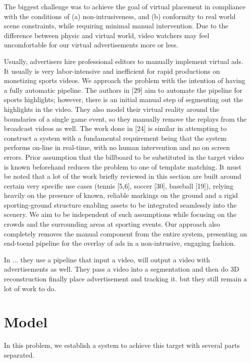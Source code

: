 \documentclass{sig-alternate}
\begin{document}
The biggest challenge was to achieve the goal of virtual placement in compliance with the conditions of (a) non-intrusiveness, and (b) conformity to real world scene constraints, while requiring minimal manual intervention. 
Due to the difference between physic and virtual world, video watchers may feel uncomfortable for our virtual advertisements more or less.

Usually, advertisers hire professional editors to manually implement virtual ads. 
It usually is very labor-intensive and inefficient for rapid productions on monetizing
sports videos. We approach the problem with the intention of having a fully
automatic pipeline. The authors in [29] aim to automate the pipeline for sports
highlights; however, there is an initial manual step of segmenting out the highlights
in the video. They also model their virtual reality around the boundaries
of a single game event, so they manually remove the replays from the broadcast
videos as well. The work done in [24] is similar in attempting to construct a
system with a fundamental requirement being that the system performs on-line
in real-time, with no human intervention and no on screen errors. Prior assumption
that the billboard to be substituted in the target video is known beforehand
reduces the problem to one of template matching.
It must be noted that a lot of the work briefly reviewed in this section are
built around certain very specific use cases (tennis [5,6], soccer [30], baseball
[19]), relying heavily on the presence of known, reliable markings on the ground
and a rigid sporting-ground structure enabling assets to be integrated seamlessly
into the scenery.
We aim to be independent of such assumptions while focusing on the crowds
and the surrounding areas at sporting events. Our approach also completely
removes the manual component from the entire system, presenting an end-toend
pipeline for the overlay of ads in a non-intrusive, engaging fashion.

In ... they use a pipeline that input a video, will output a video with advertisements as well. They pass a video into a segmentation and then do 3D reconstruction finally place advertisement and tracking it. but they still remain a lot of work to do.

\section{Model}
\label{sec:model}

In this problem, we establish a system to achieve this target with several parts separated. 
\end{document}
